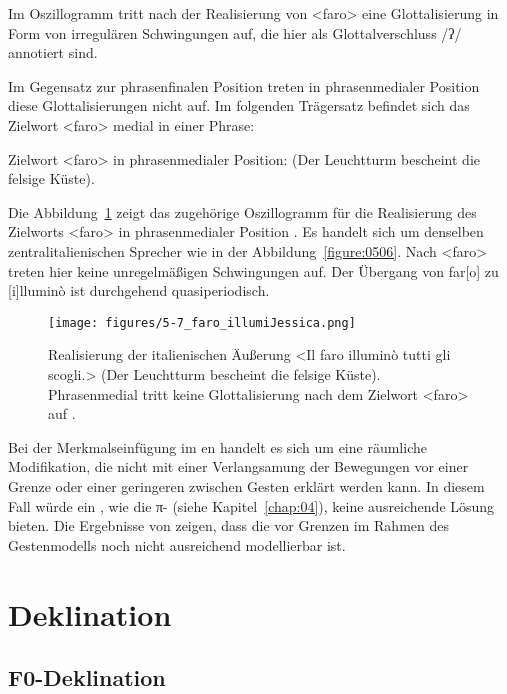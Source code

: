 Im Oszillogramm tritt nach der Realisierung von <faro> eine Glottalisierung in Form von irregulären Schwingungen auf, die hier als Glottalverschluss /ʔ/ annotiert sind.

Im Gegensatz zur phrasenfinalen Position treten in phrasenmedialer Position diese Glottalisierungen nicht auf. Im folgenden Trägersatz befindet sich das Zielwort <faro> medial in einer Phrase: 

\begin{exe}
	\ex Zielwort <faro> in phrasenmedialer Position:\label{ex:0510}
	\sn (Der Leuchtturm bescheint die felsige Küste).
\end{exe}

Die Abbildung~\ref{figure:0507} zeigt das zugehörige Oszillogramm für die Realisierung des Zielworts <faro> in phrasenmedialer Position \citep[aus][]{DiNapoli2012}. Es handelt sich um denselben zentralitalienischen Sprecher wie in der Abbildung~\ref{figure:0506}. Nach <faro> treten hier keine unregelmäßigen Schwingungen auf. Der Übergang von far[o] zu [i]lluminò ist durchgehend quasiperiodisch.

\begin{figure}
	\texttt{[image: figures/5-7\_faro\_illumiJessica.png]}
	\caption{Realisierung der italienischen Äußerung <Il faro illuminò tutti gli scogli.> (Der Leuchtturm bescheint die felsige Küste). Phrasenmedial tritt keine Glottalisierung nach dem Zielwort <faro> auf \citep[aus][]{DiNapoli2012}.}
	\label{figure:0507}
\end{figure}

Bei der Merkmalseinfügung im en handelt es sich um eine räumliche Modifikation, die nicht mit einer Verlangsamung der Bewegungen vor einer Grenze oder einer geringeren  zwischen Gesten erklärt werden kann. In diesem Fall würde ein , wie die π- (siehe Kapitel~\ref{chap:04}), keine ausreichende Lösung bieten. Die Ergebnisse von \citet{DiNapoli2012} zeigen, dass die  vor Grenzen im Rahmen des Gestenmodells noch nicht ausreichend modellierbar ist.

\section{Deklination}
\label{sec:0503}

\subsection{F0-Deklination}
\label{subsec:050301}

